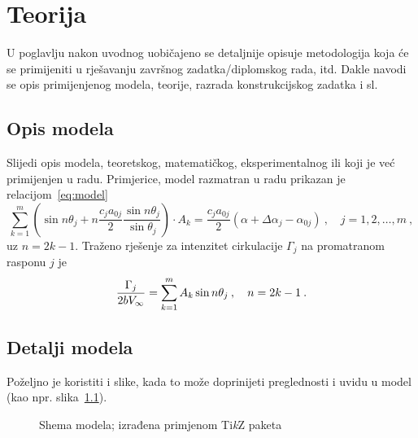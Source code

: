 \chapter{Teorija}

U poglavlju nakon uvodnog uobičajeno se detaljnije opisuje
metodologija koja će se primijeniti u rješavanju završnog zadatka/diplomskog
rada, itd. Dakle navodi se opis primijenjenog modela, teorije, razrada
konstrukcijskog zadatka i sl.

\section{Opis modela}
Slijedi opis modela, teoretskog, matematičkog, eksperimentalnog ili koji je već
primijenjen u radu. Primjerice, model razmatran u radu prikazan je
relacijom~\eqref{eq:model}
\begin{equation}\label{eq:model}
\sum\limits_{k = 1}^m {\left( {\sin n\theta_j + n\frac{c_j a_{0j}}{2} \frac{\sin n\theta_j}
{\sin \theta_j}} \right)} \cdot A_k = \frac{c_j a_{0j}}{2} \left( {\alpha + \Delta\alpha_j - \alpha_{0j} } \right)\:,\quad j = 1,2,\ldots,m\:,
\end{equation} 
%
%
%
%
%
%
%
%
%
uz $n = 2k - 1$. Traženo rješenje za intenzitet cirkulacije $\Gamma_j$ na
promatranom rasponu $j$ je
\begin{equation} 
\frac{\Gamma_j}{{2b\hbox{$V_{\infty}$}}} = \sum_{k=1}^{m}{A_k\sin{n\theta_j}}\:,\quad n=2k-1\:.
\end{equation} 
%
%
%

\section{Detalji modela}
Poželjno je koristiti i slike, kada to može doprinijeti preglednosti i uvidu u model (kao
npr. slika~\ref{fig:model}). 
%
\begin{figure}
	\centering
{}
\caption{Shema modela; izrađena primjenom Ti\textit{k}Z paketa}
	\label{fig:model}
\end{figure}

